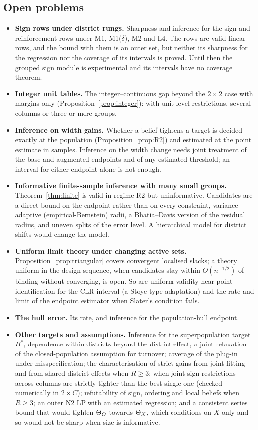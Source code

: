 \subsection{Open problems}

\begin{itemize}
\item \textbf{Sign rows under district rungs.} Sharpness and inference for the sign
and reinforcement rows under M1, M1($\delta$), M2 and L4. The rows are valid linear
rows, and the bound with them is an outer set, but neither its sharpness for the
regression nor the coverage of its intervals is proved. Until then the grouped
sign module is experimental and its intervals have no coverage theorem.
\item \textbf{Integer unit tables.} The integer--continuous gap beyond the
$2\times2$ case with margins only (Proposition~\ref{prop:integer}): with unit-level
restrictions, several columns or three or more groups.
\item \textbf{Inference on width gains.} Whether a belief tightens a target is
decided exactly at the population (Proposition~\ref{prop:R2}) and estimated at the
point estimate in samples. Inference on the width change needs joint treatment of
the base and augmented endpoints and of any estimated threshold; an interval for
either endpoint alone is not enough.
\item \textbf{Informative finite-sample inference with many small groups.}
Theorem~\ref{thm:finite} is valid in regime R2 but uninformative. Candidates are a
direct bound on the endpoint rather than on every constraint, variance-adaptive
(empirical-Bernstein) radii, a Bhatia--Davis version of the residual radius, and
uneven splits of the error level. A hierarchical model for district shifts would
change the model.
\item \textbf{Uniform limit theory under changing active sets.}
Proposition~\ref{prop:triangular} covers convergent localised slacks; a theory
uniform in the design sequence, when candidates stay within $O(n^{-1/2})$ of binding
without converging, is open. So are uniform validity near point identification for
the CLR interval (a Stoye-type adaptation) and the rate and limit of the endpoint
estimator when Slater's condition fails.
\item \textbf{The hull error.} Its rate, and inference for the population-hull
endpoint.
\item \textbf{Other targets and assumptions.} Inference for the superpopulation
target $B^*$; dependence within districts beyond the district effect; a joint
relaxation of the closed-population assumption for turnover; coverage of the
plug-in under misspecification; the characterisation of strict gains from joint
fitting and from shared district effects when $R\ge3$; when joint sign restrictions
across columns are strictly tighter than the best single one (checked numerically
in $2\times C$); refutability of sign,
ordering and local beliefs when $R\ge3$; an outer N2 LP with an estimated
regression; and a consistent series bound that would tighten $\Theta_O$ towards $\Theta_X$,
which conditions on $X$ only and so would not be sharp when size is informative.
\end{itemize}

